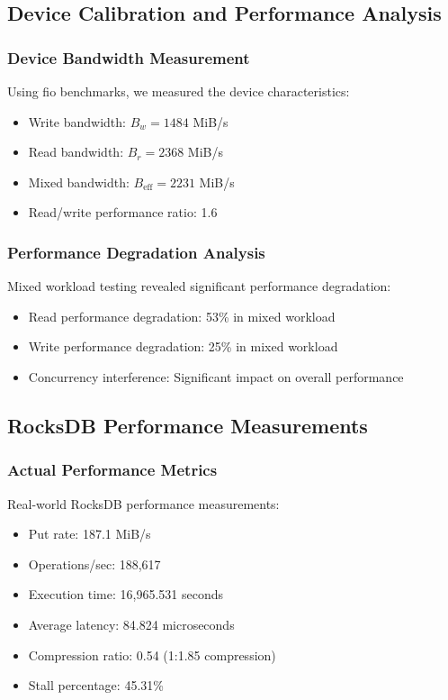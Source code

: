 \documentclass[11pt,twocolumn]{article}
\begin{document}
\subsection{Device Calibration and Performance Analysis}

\subsubsection{Device Bandwidth Measurement}
Using fio benchmarks, we measured the device characteristics:
\begin{itemize}
    \item Write bandwidth: $B_w = 1484$ MiB/s
    \item Read bandwidth: $B_r = 2368$ MiB/s  
    \item Mixed bandwidth: $B_{\text{eff}} = 2231$ MiB/s
    \item Read/write performance ratio: 1.6
\end{itemize}

\subsubsection{Performance Degradation Analysis}
Mixed workload testing revealed significant performance degradation:
\begin{itemize}
    \item Read performance degradation: 53\% in mixed workload
    \item Write performance degradation: 25\% in mixed workload
    \item Concurrency interference: Significant impact on overall performance
\end{itemize}

\subsection{RocksDB Performance Measurements}

\subsubsection{Actual Performance Metrics}
Real-world RocksDB performance measurements:
\begin{itemize}
    \item Put rate: 187.1 MiB/s
    \item Operations/sec: 188,617
    \item Execution time: 16,965.531 seconds
    \item Average latency: 84.824 microseconds
    \item Compression ratio: 0.54 (1:1.85 compression)
    \item Stall percentage: 45.31\%
\end{itemize}
\end{document}
